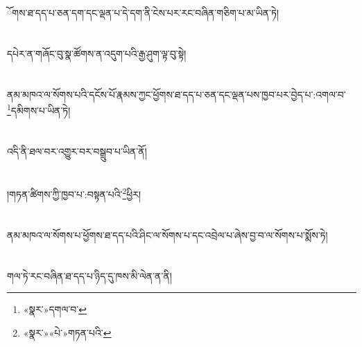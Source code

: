 ོགས་ཐ་དད་པ་ཅན་དག་དང་ལྡན་པ་དེ་དག་ནི་ངེས་པར་རང་བཞིན་གཅིག་པ་མ་ཡིན་ཏེ།\chapter{ }དཔེར་ན་གཞོང་བུ་སྣ་ཚོགས་ན་འདུག་པའི་རྒྱ་ཤུག་ལྟ་བུ་སྟེ།\chapter{ }ནམ་མཁའ་ལ་སོགས་པའི་དངོས་པོ་རྣམས་ཀྱང་ཕྱོགས་ཐ་དད་པ་ཅན་དང་ལྡན་པས་ཁྱབ་པར་བྱེད་པ་:འགལ་བ་\footnote{«སྣར་»དགལ་བ་}དམིགས་པ་ཡིན་ཏེ།\chapter{ }འདི་ནི་ཐལ་བར་འགྱུར་བར་བསྒྲུབ་པ་ཡིན་ནོ།\chapter{ }།གཏན་ཚིགས་ཀྱི་ཁྱབ་པ་:བསྟན་པའི་\footnote{«སྣར་»«པེ་»གཏན་པའི་}ཕྱིར།\chapter{ }ནམ་མཁའ་ལ་སོགས་པ་ཕྱོགས་ཐ་དད་པའི་ཤིང་ལ་སོགས་པ་དང་འབྲེལ་པ་ཞེས་བྱ་བ་ལ་སོགས་པ་སྨོས་ཏེ།\chapter{ }གལ་ཏེ་རང་བཞིན་ཐ་དད་པ་ཉིད་དུ་ཁས་མི་ལེན་ན་ནི།\chap